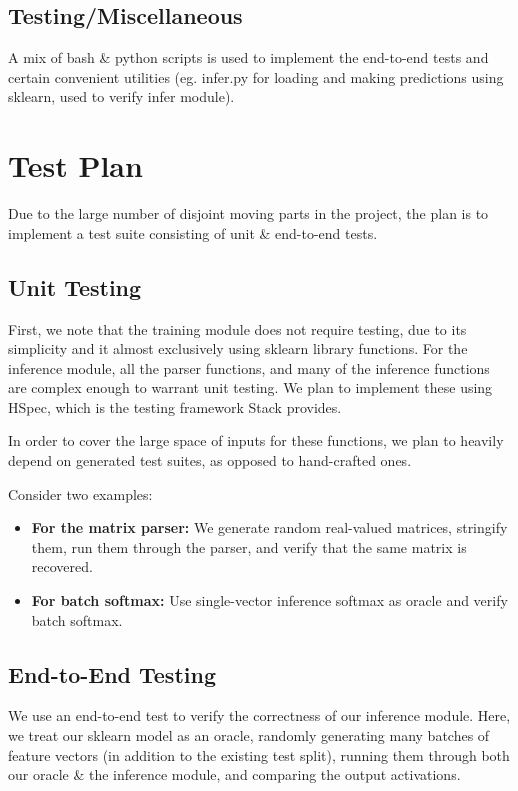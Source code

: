 \documentclass[12pt]{article}
\begin{document}
\subsection{Testing/Miscellaneous}
A mix of bash \& python scripts is used to implement the end-to-end tests and certain convenient utilities (eg. infer.py for loading and making predictions using sklearn, used to verify infer module). 

\section{Test Plan}
Due to the large number of disjoint moving parts in the project, the plan is to implement a test suite consisting of unit \& end-to-end tests.

\subsection{Unit Testing}
First, we note that the training module does not require testing, due to its simplicity and it almost exclusively using sklearn library functions. For the inference module, all the parser functions, and many of the inference functions are complex enough to warrant unit testing. We plan to implement these using HSpec, which is the testing framework Stack provides.\bigskip

In order to cover the large space of inputs for these functions, we plan to heavily depend on generated test suites, as opposed to hand-crafted ones.

Consider two examples:
\begin{itemize}
	\item \textbf{For the matrix parser:} We generate random real-valued matrices, stringify them, run them through the parser, and verify that the same matrix is recovered.
	\item \textbf{For batch softmax:} Use single-vector inference softmax as oracle and verify batch softmax.
\end{itemize}

\subsection{End-to-End Testing}
We use an end-to-end test to verify the correctness of our inference module. Here, we treat our sklearn model as an oracle, randomly generating many batches of feature vectors (in addition to the existing test split), running them through both our oracle \& the inference module, and comparing the output activations.
\end{document}

